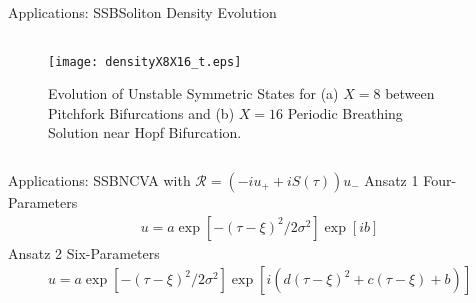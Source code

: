 \begin{frame}[c]{Applications: SSB}{Soliton Density Evolution}
\begin{columns}
\begin{column}{0.5\textwidth}
\begin{figure}[h]
\centering
\texttt{[image: densityX8X16\_t.eps]}
\caption{Evolution of Unstable Symmetric States for (a) $X=8$ between Pitchfork Bifurcations and (b) $X =16$ Periodic Breathing Solution near Hopf Bifurcation.}
\end{figure}
\end{column}
\begin{column}{0.5\textwidth}
\centering
		\\
		
\end{column}
\end{columns}
\end{frame}

\begin{frame}[c]{Applications: SSB}{NCVA with $\mathcal{R} = (-i u_+ + i S(\tau))u_-$}
\textcolor{paleblue}{Ansatz 1}  Four-Parameters
\fontsize{9}{9}\textcolor{regal}{\begin{align*} u = a \exp[-(\tau-\xi)^2/2\sigma^2] \exp[ib]   \end{align*}}
\textcolor{paleblue}{Ansatz 2} Six-Parameters 
\fontsize{9}{9}\textcolor{regal}{{\begin{align*} 
u = a \exp[-(\tau-\xi)^2/2\sigma^2] \exp[i(d(\tau-\xi)^2 + c(\tau - \xi) + b)] 
\end{align*}}}
\end{frame}

